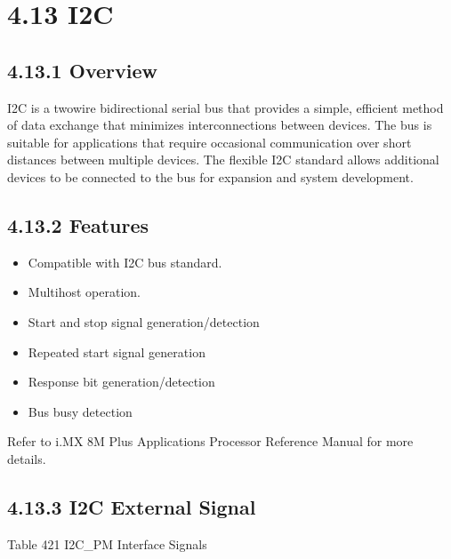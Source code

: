 \documentclass[letterpaper,10pt,openany,english]{sphinxmanual}
\begin{document}
\section{4.13 I2C}
\label{\detokenize{hardware:i2c}}

\subsection{4.13.1 Overview}
\label{\detokenize{hardware:id18}}
\sphinxAtStartPar
I2C is a two\sphinxhyphen{}wire bidirectional serial bus that provides a simple, efficient method of data exchange that minimizes interconnections between devices. The bus is suitable for applications that require occasional communication over short distances between multiple devices. The flexible I2C standard allows additional devices to be connected to the bus for expansion and system development.


\subsection{4.13.2 Features}
\label{\detokenize{hardware:id19}}\begin{itemize}
\item {} 
\sphinxAtStartPar
Compatible with I2C bus standard.

\item {} 
\sphinxAtStartPar
Multi\sphinxhyphen{}host operation.

\item {} 
\sphinxAtStartPar
Start and stop signal generation/detection

\item {} 
\sphinxAtStartPar
Repeated start signal generation

\item {} 
\sphinxAtStartPar
Response bit generation/detection

\item {} 
\sphinxAtStartPar
Bus busy detection

\end{itemize}

\sphinxAtStartPar
Refer to i.MX 8M Plus Applications Processor Reference Manual for more details.


\subsection{4.13.3 I2C External Signal}
\label{\detokenize{hardware:i2c-external-signal}}
\sphinxAtStartPar
Table 4\sphinxhyphen{}21 I2C\_PM Interface Signals
\end{document}
